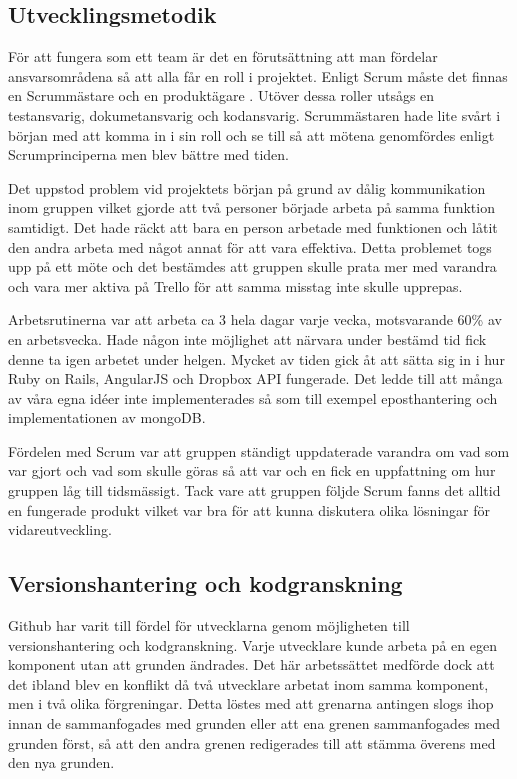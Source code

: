 \subsection{Utvecklingsmetodik}

För att fungera som ett team är det en förutsättning att man fördelar ansvarsområdena så att alla får en roll i projektet. Enligt Scrum måste det finnas en Scrummästare och en produktägare . Utöver dessa roller utsågs en testansvarig, dokumetansvarig och kodansvarig. Scrummästaren hade lite svårt i början med att komma in i sin roll och se till så att mötena genomfördes enligt Scrumprinciperna men blev bättre med tiden.

Det uppstod problem vid projektets början på grund av dålig kommunikation inom gruppen vilket gjorde att två personer började arbeta på samma funktion samtidigt. Det hade räckt att bara en person arbetade med funktionen och låtit den andra arbeta med något annat för att vara effektiva. Detta problemet togs upp på ett möte och det bestämdes att gruppen skulle prata mer med varandra och vara mer aktiva på Trello för att samma misstag inte skulle upprepas.

Arbetsrutinerna var att arbeta ca 3 hela dagar varje vecka, motsvarande 60\% av en arbetsvecka. Hade någon inte möjlighet att närvara under bestämd tid fick denne ta igen arbetet under helgen. Mycket av tiden gick åt att sätta sig in i hur Ruby on Rails, AngularJS och Dropbox API fungerade. Det ledde till att många av våra egna idéer inte implementerades så som till exempel eposthantering och implementationen av mongoDB.

Fördelen med Scrum var att gruppen ständigt uppdaterade varandra om vad som var gjort och vad som skulle göras så att var och en fick en uppfattning om hur gruppen låg till tidsmässigt.  Tack vare att gruppen följde Scrum fanns det alltid en fungerade produkt vilket var bra för att kunna diskutera olika lösningar för vidareutveckling.

\subsection{Versionshantering och kodgranskning}

Github har varit till fördel för utvecklarna genom möjligheten till versionshantering och kodgranskning. Varje utvecklare kunde arbeta på en egen komponent utan att grunden ändrades. Det här arbetssättet medförde dock att det ibland blev en konflikt då två utvecklare arbetat inom samma komponent, men i två olika förgreningar. Detta löstes med att grenarna antingen slogs ihop innan de sammanfogades med grunden eller att ena grenen sammanfogades med grunden först, så att den andra grenen redigerades till att stämma överens med den nya grunden.

